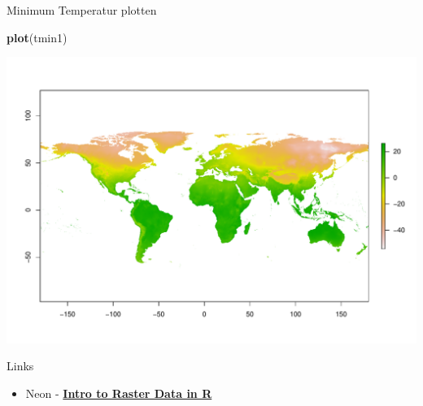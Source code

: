 \documentclass[ignorenonframetext,]{beamer}
\newenvironment{Shaded}{\begin{snugshade}}{\end{snugshade}}
\newcommand{\KeywordTok}[1]{\textcolor[rgb]{0.26,0.66,0.93}{\textbf{#1}}}
\newcommand{\NormalTok}[1]{\textcolor[rgb]{0.74,0.68,0.62}{#1}}
\providecommand{\tightlist}{%
  \setlength{\itemsep}{0pt}\setlength{\parskip}{0pt}}
\begin{document}
\begin{frame}[fragile]{Minimum Temperatur plotten}
\protect\hypertarget{minimum-temperatur-plotten}{}

\begin{Shaded}
\begin{Highlighting}[]
\KeywordTok{plot}\NormalTok{(tmin1)}
\end{Highlighting}
\end{Shaded}

\includegraphics{A8_Rasterdaten_files/figure-beamer/unnamed-chunk-19-1.pdf}

\end{frame}

\begin{frame}{Links}
\protect\hypertarget{links}{}

\begin{itemize}
\tightlist
\item
  Neon -
  \href{https://www.neonscience.org/dc-raster-data-r}{\textbf{Intro to
  Raster Data in R}}
\end{itemize}

\end{frame}
\end{document}
